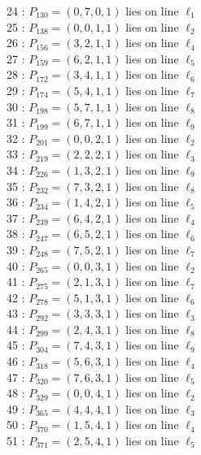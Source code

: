 \documentclass{article}
\begin{document}
{\begin{multicols}{2}
24 : $P_{130}=( 0, 7, 0, 1 )$ lies on line $\ell_{1}$\\
25 : $P_{138}=( 0, 0, 1, 1 )$ lies on line $\ell_{2}$\\
26 : $P_{156}=( 3, 2, 1, 1 )$ lies on line $\ell_{4}$\\
27 : $P_{159}=( 6, 2, 1, 1 )$ lies on line $\ell_{5}$\\
28 : $P_{172}=( 3, 4, 1, 1 )$ lies on line $\ell_{6}$\\
29 : $P_{174}=( 5, 4, 1, 1 )$ lies on line $\ell_{7}$\\
30 : $P_{198}=( 5, 7, 1, 1 )$ lies on line $\ell_{8}$\\
31 : $P_{199}=( 6, 7, 1, 1 )$ lies on line $\ell_{9}$\\
32 : $P_{201}=( 0, 0, 2, 1 )$ lies on line $\ell_{2}$\\
33 : $P_{219}=( 2, 2, 2, 1 )$ lies on line $\ell_{3}$\\
34 : $P_{226}=( 1, 3, 2, 1 )$ lies on line $\ell_{9}$\\
35 : $P_{232}=( 7, 3, 2, 1 )$ lies on line $\ell_{8}$\\
36 : $P_{234}=( 1, 4, 2, 1 )$ lies on line $\ell_{5}$\\
37 : $P_{239}=( 6, 4, 2, 1 )$ lies on line $\ell_{4}$\\
38 : $P_{247}=( 6, 5, 2, 1 )$ lies on line $\ell_{6}$\\
39 : $P_{248}=( 7, 5, 2, 1 )$ lies on line $\ell_{7}$\\
40 : $P_{265}=( 0, 0, 3, 1 )$ lies on line $\ell_{2}$\\
41 : $P_{275}=( 2, 1, 3, 1 )$ lies on line $\ell_{7}$\\
42 : $P_{278}=( 5, 1, 3, 1 )$ lies on line $\ell_{6}$\\
43 : $P_{292}=( 3, 3, 3, 1 )$ lies on line $\ell_{3}$\\
44 : $P_{299}=( 2, 4, 3, 1 )$ lies on line $\ell_{8}$\\
45 : $P_{304}=( 7, 4, 3, 1 )$ lies on line $\ell_{9}$\\
46 : $P_{318}=( 5, 6, 3, 1 )$ lies on line $\ell_{4}$\\
47 : $P_{320}=( 7, 6, 3, 1 )$ lies on line $\ell_{5}$\\
48 : $P_{329}=( 0, 0, 4, 1 )$ lies on line $\ell_{2}$\\
49 : $P_{365}=( 4, 4, 4, 1 )$ lies on line $\ell_{3}$\\
50 : $P_{370}=( 1, 5, 4, 1 )$ lies on line $\ell_{4}$\\
51 : $P_{371}=( 2, 5, 4, 1 )$ lies on line $\ell_{5}$\\

\end{multicols}}
\end{document}
